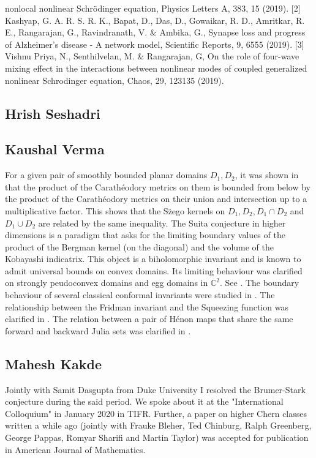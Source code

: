 nonlocal nonlinear Schrödinger equation, Physics Letters A, 383, 15 (2019).   [2] Kashyap, G. A. R. S. R. K., Bapat, D., Das, D., Gowaikar, R. D., Amritkar, R. E., Rangarajan, G., Ravindranath, V. & Ambika, G., Synapse loss and progress of Alzheimer’s disease - A network model, Scientific Reports, 9, 6555 (2019).   [3] Vishnu Priya, N., Senthilvelan, M. &  Rangarajan, G, On the role of four-wave mixing effect in the interactions between nonlinear modes of coupled generalized nonlinear Schrodinger equation, Chaos, 29, 123135 (2019).


\subsection{Hrish Seshadri}




\subsection{Kaushal Verma}

For a given pair of smoothly bounded planar domains $D_1, D_2$, it was shown in \cite{1} that the product of the Carath\'{e}odory metrics on them is bounded from below by the product of the Carath\'{e}odory metrics on their union and intersection up to a multiplicative factor. This shows that the S\"{z}ego kernels on $D_1, D_2, D_1 \cap D_2$ and $D_1 \cup D_2$ are related by the same inequality.    The Suita conjecture in higher dimensions is a paradigm that asks for the limiting boundary values of the product of the Bergman kernel (on the diagonal) and the volume of the Kobayashi indicatrix. This object is a biholomorphic invariant and is known to admit universal bounds on convex domains. Its limiting behaviour was clarified on strongly peudoconvex domains and egg domains in $\mathbb C^2$. See \cite{2}.  The boundary behaviour of several classical conformal invariants were studied in \cite{3}.  The relationship between the Fridman invariant and the Squeezing function was clarified in \cite{4}.  The relation between a pair of H\'{e}non maps that share the same forward and backward Julia sets was clarified in \cite{5}.


\subsection{Mahesh Kakde}

Jointly with Samit Dasgupta from Duke University I resolved the Brumer-Stark conjecture during the said period. We spoke about it at the "International Colloquium" in January 2020 in TIFR. Further, a paper on higher Chern classes written a while ago (jointly with Frauke Bleher, Ted Chinburg,  Ralph Greenberg, George Pappas, Romyar Sharifi and Martin Taylor) was accepted for publication in American Journal of Mathematics.


